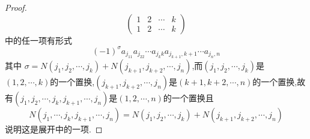 {\begin{proof}
\[\begin{pmatrix}
                1 & 2 & \cdots & k \\
                1 & 2 & \cdots & k
            \end{pmatrix}
        \]
        中的任一项有形式
        \[
            \left(-1\right)^{\sigma}
            a_{j_11}a_{j_22}\cdots
            a_{j_kk}a_{j_{k+1},k+1}\cdots
            a_{j_n,n}
        \]
        其中
        $\sigma =N\left(
            j_1,j_2,\cdots,j_k
            \right)+N\left(
            j_{k+1},j_{k+2},\cdots,j_n
            \right)$,而$\left(j_1,j_2,\cdots,j_k\right)$是$\left(1,2,\cdots,k\right)$的一个置换,$\left(j_{k + 1},j_{k+2},\cdots,j_n\right)$是$\left(k+1,k+2,\cdots,n\right)$的一个置换,故有$\left(
            j_1,j_2,\cdots,j_k,j_{k+1},\cdots,j_n
            \right)$是$\left(1,2,\cdots,n\right)$的一个置换且
        \[
            N\left(j_1,\cdots,j_k,j_{k+1},\cdots,j_n\right)
            =N\left(j_1,j_2,\cdots,j_k\right)+
            N\left(j_{k+1},j_{k+2},\cdots,j_n\right)
        \]
        说明这是展开中的一项.


\end{proof}}
